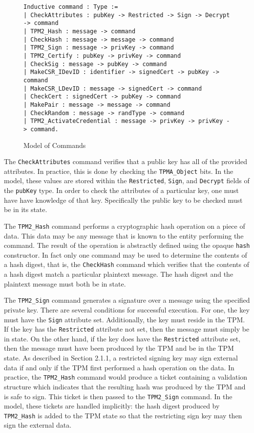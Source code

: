 \begin{figure}[h]
\begin{lstlisting}[language=Coq]
Inductive command : Type :=
| CheckAttributes : pubKey -> Restricted -> Sign -> Decrypt -> command
| TPM2_Hash : message -> command
| CheckHash : message -> message -> command
| TPM2_Sign : message -> privKey -> command
| TPM2_Certify : pubKey -> privKey -> command
| CheckSig : message -> pubKey -> command
| MakeCSR_IDevID : identifier -> signedCert -> pubKey -> command
| MakeCSR_LDevID : message -> signedCert -> command
| CheckCert : signedCert -> pubKey -> command
| MakePair : message -> message -> command
| CheckRandom : message -> randType -> command
| TPM2_ActivateCredential : message -> privKey -> privKey -> command.
\end{lstlisting}
\caption{Model of Commands}
\end{figure}

The \verb|CheckAttributes| command verifies that a public key has all of the provided attributes. In practice, this is done by checking the \verb|TPMA_Object|  bits. In the model, these values are stored within the \verb|Restricted|, \verb|Sign|, and \verb|Decrypt| fields of the \verb|pubKey| type. In order to check the attributes of a particular key, one must have have knowledge of that key. Specifically the public key to be checked must be in its state.

The \verb|TPM2_Hash| command performs a cryptographic hash operation on a piece of data. This data may be any message that is known to the entity performing the command. The result of the operation is abstractly defined using the opaque \verb|hash| constructor. In fact only one command may be used to determine the contents of a hash digest, that is, the \verb|CheckHash| command which verifies that the contents of a hash digest match a particular plaintext message. The hash digest and the plaintext message must both be in state. 

The \verb|TPM2_Sign| command generates a signature over a message using the specified private key. There are several conditions for successful execution. For one, the key must have the \verb|Sign| attribute set. Additionally, the key must reside in the TPM. If the key has the \verb|Restricted| attribute not set, then the message must simply be in state. On the other hand, if the key does have the \verb|Restricted| attribute set, then the message must have been produced by the TPM and be in the TPM state. As described in Section 2.1.1, a restricted signing key may sign external data if and only if the TPM first performed a hash operation on the data. In practice, the \verb|TPM2_Hash| command would produce a ticket containing a validation structure which indicates that the resulting hash was produced by the TPM and is safe to sign. This ticket is then passed to the \verb|TPM2_Sign| command. In the model, these tickets are handled implicitly: the hash digest produced by \verb|TPM2_Hash| is added to the TPM state so that the restricting sign key may then sign the external data. 


